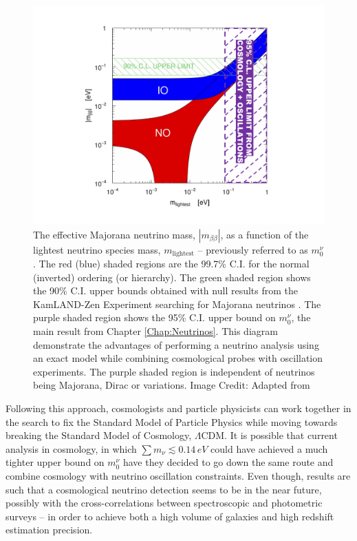 \begin{figure}
\begin{center}
\includegraphics[scale=0.60]{Intro-FIGS/doublebeta.pdf}
\caption[The effective Majorana neutrino mass, $|m_{\beta\beta}|$, as a function of the lightest neutrino species mass.]{The effective Majorana neutrino mass, $|m_{\beta\beta}|$, as a function of the lightest neutrino species mass, $m_{\text{lightest}}$ -- previously referred to as $m_0^{\nu}$. The red (blue) shaded regions are the 99.7\% C.I. for the normal (inverted) ordering (or hierarchy). The green shaded region shows the 90\% C.I. upper bounds obtained with null results from the KamLAND-Zen Experiment searching for Majorana neutrinos \citep{2016KamLANDMajorana}. The purple shaded region shows the 95\% C.I. upper bound on $m_{0}^{\nu}$, the main result from Chapter \ref{Chap:Neutrinos}. This diagram demonstrate the advantages of performing a neutrino analysis using an exact model while combining cosmological probes with oscillation experiments. The purple shaded region is independent of neutrinos being Majorana, Dirac or variations. Image Credit: Adapted from \cite{2018MassOrdering}}
\label{fig:Major}
\end{center}
\end{figure}

\qquad Following this approach, cosmologists and particle physicists can work together in the search to fix the Standard Model of Particle Physics while moving towards breaking the Standard Model of Cosmology, $\Lambda$CDM. It is possible that current analysis in cosmology, in which $\sum m_{\nu} \lesssim 0.14\, eV$ \citep{2015LyAlpha-Deg,2016Cuesta-Deg} could have achieved a much tighter upper bound on $m_0^{\nu}$ have they decided to go down the same route and combine cosmology with neutrino oscillation constraints. Even though, results are such that a cosmological neutrino detection seems to be in the near future, possibly with the cross-correlations between spectroscopic and photometric surveys -- in order to achieve both a high volume of galaxies and high redshift estimation precision.

